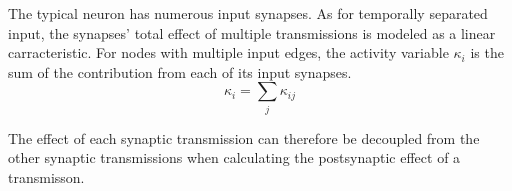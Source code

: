 		The typical neuron has numerous input synapses. 
		As for temporally separated input, the synapses' total effect of multiple transmissions is modeled as a linear carracteristic. %
		For nodes with multiple input edges, the activity variable $\kappa_i$ is the sum of the contribution from each of its input synapses.
		\begin{equation}
			\kappa_i = \sum_j{\kappa_{ij}}
			\label{eqSumOfKij}
		\end{equation}

		The effect of each synaptic transmission can therefore be decoupled from the other synaptic transmissions when calculating the postsynaptic effect of a transmisson.






